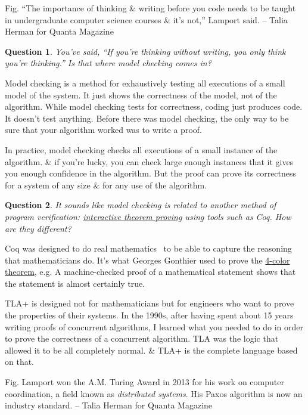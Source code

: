 \documentclass[oneside]{book}
\numberwithin{equation}{section}
\newtheorem{question}{Question}[chapter]
\begin{document}
\textsf{Fig. ``The importance of thinking \& writing before you code needs to be taught in undergraduate computer science courses \& it's not,'' Lamport said.} -- Talia Herman for Quanta Magazine

\begin{question}
	You've said, ``If you're thinking without writing, you only think you're thinking.'' Is that where model checking comes in?
\end{question}
Model checking is a method for exhaustively testing all executions of a small model of the system. It just shows the correctness of the model, not of the algorithm. While model checking tests for correctness, coding just produces code. It doesn't test anything. Before there was model checking, the only way to be sure that your algorithm worked was to write a proof.

In practice, model checking checks all executions of a small instance of the algorithm. \& if you're lucky, you can check large enough instances that it gives you enough confidence in the algorithm. But the proof can prove its correctness for a system of any size \& for any use of the algorithm.

\begin{question}
	It sounds like model checking is related to another method of program verification: \href{https://www.quantamagazine.org/building-the-mathematical-library-of-the-future-20201001/}{interactive theorem proving} using tools such as Coq. How are they different?
\end{question}
Coq was designed to do real mathematics \ to be able to capture the reasoning that mathematicians do. It's what Georges Gonthier used to prove the \href{https://www.quantamagazine.org/decades-old-graph-problem-yields-to-amateur-mathematician-20180417/}{4-color theorem}, e.g. A machine-checked proof of a mathematical statement shows that the statement is almost certainly true.

TLA+ is designed not for mathematicians but for engineers who want to prove the properties of their systems. In the 1990s, after having spent about 15 years writing proofs of concurrent algorithms, I learned what you needed to do in order to prove the correctness of a concurrent algorithm. TLA was the logic that allowed it to be all completely normal. \& TLA+ is the complete language based on that.

\textsf{Fig. Lamport won the A.M. Turing Award in 2013 for his work on computer coordination, a field known as \textit{distributed systems}. His Paxos algorithm is now an industry standard.} -- Talia Herman for Quanta Magazine
\end{document}
